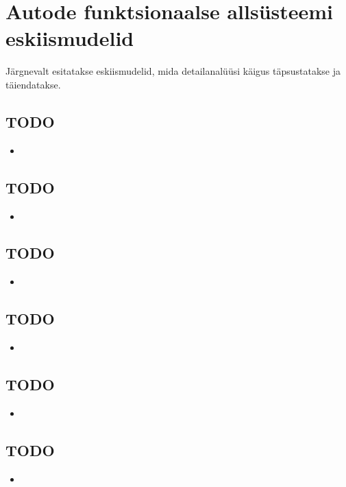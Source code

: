 \documentclass{report}
\begin{document}
 

 
 \section{Autode funktsionaalse allsüsteemi eskiismudelid}
Järgnevalt esitatakse eskiismudelid, mida detailanalüüsi käigus täpsustatakse ja täiendatakse.
 
 \subsection{TODO}
 \begin{itemize}
 	\item 
 \end{itemize}
 
   \subsection{TODO}
 \begin{itemize}
 	\item 
 \end{itemize}
 
 \subsection{TODO}
 \begin{itemize}
 	\item 
 \end{itemize}

 \subsection{TODO}
\begin{itemize}
	\item 
\end{itemize}

\subsection{TODO}
\begin{itemize}
	\item 
\end{itemize}

\subsection{TODO}
\begin{itemize}
	\item 
\end{itemize}
\end{document}
